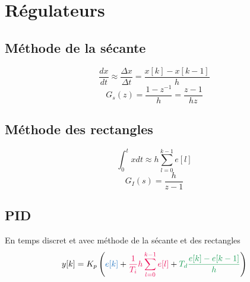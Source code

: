 \documentclass[resume]{subfiles}
\begin{document}
\section{Régulateurs}
\subsection{Méthode de la sécante}
$$\boxed{\frac{dx}{dt}\approx\frac{\Delta x}{\Delta t}=\frac{x[k]-x[k-1]}{h}}$$
$$G_s(z)=\frac{1-z^{-1}}{h}=\frac{z-1}{hz}$$
\subsection{Méthode des rectangles}
$$\boxed{\int_{0}^{t}xdt\approx h\sum_{l=0}^{k-1}e[l]}$$
$$G_{I}(s)=\frac{h}{z-1}$$
\subsection{PID}
En temps discret et avec méthode de la sécante et des rectangles
$$y[k]=K_p\left(\Pcolor{e[k]}+\Icolor{\frac{1}{T_i}h\sum_{l=0}^{k-1}e[l]}+\Dcolor{T_d\frac{e[k]-e[k-1]}{h}}\right)$$
\end{document}
